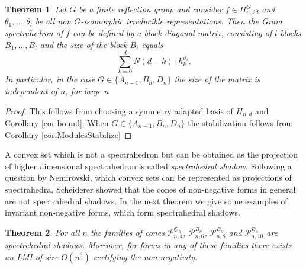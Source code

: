 \documentclass[11pt,a4paper]{amsart}
\numberwithin{equation}{section}
\newtheorem{thm}{Theorem}
\theoremstyle{definition}
\numberwithin{thm}{section}
\theoremstyle{break}
\numberwithin{subcase}{case}
\begin{document}
\begin{thm}
Let $G$ be a finite reflection group and consider $f\in H_{n,2d}^{G}$ and $\theta_1,\ldots,\theta_l$ be all non $G$-isomorphic irreducible representations. Then the Gram spectrahedron of $f$ can be defined by a block diagonal matrix, consisting of $l$ blocks $B_1,\ldots,B_l$ and the size of the block $B_i$ equals
$$\sum_{k=0}^dN(d-k)\cdot h_k^{\vartheta_i}.$$
In particular, in the case $G\in\{A_{n-1},B_n,D_n\}$ the size of the matrix is independent of $n$, for large $n$
\end{thm}
\begin{proof}
This follows from choosing a symmetry adapted basis of $H_{n,d}$ and Corollary \ref{cor:bound}. When $G\in\{A_{n-1},B_n,D_n\}$ the stabilization follows from Corollary  \ref{cor:ModulesStabilize}
\end{proof}




A convex set which is not a spectrahedron but can be obtained as the projection of higher dimensional spectrahedron is called \emph{spectrahedral shadow}. Following a question by Nemirovski, which convex sets can be represented as projections of spectrahedra, Scheiderer \cite{scheiderer} showed that the cones of non-negative forms in general are not spectrahedral shadows. In the next theorem we give some examples of invariant non-negative forms, which form spectrahedral shadows.  
 


\begin{thm} 
For all $n$ the families of cones $\mathcal{P}_{n,4}^{\mathfrak{S}_n}$, $\mathcal{P}_{n,6}^{B_n}$, $\mathcal{P}_{n,8}^{B_n}$ and $\mathcal{P}_{n,10}^{B_n}$ are  spectrehedral shadows. Moreover, for forms in any of these families there exists an LMI of size $O(n^3)$ certifying the non-negativity. 
\end{thm}
\end{document}
